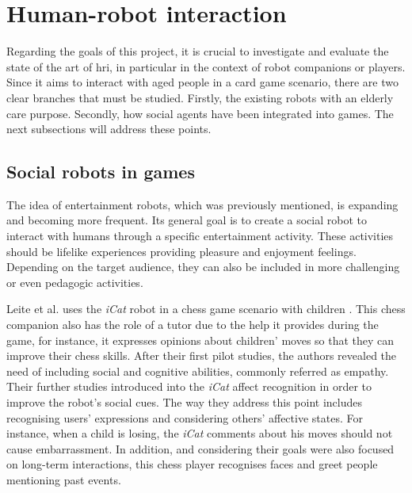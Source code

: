 \section{Human-robot interaction}

Regarding the goals of this project, it is crucial to investigate and evaluate the state of the art of \ac{hri}, in particular in the context of robot companions or players.
Since it aims to interact with aged people in a card game scenario, there are two clear branches that must be studied.
Firstly, the existing robots with an elderly care purpose.
Secondly, how social agents have been integrated into games.
The next subsections will address these points.


\subsection{Social robots in games}

The idea of entertainment robots, which was previously mentioned, is expanding and becoming more frequent.
Its general goal is to create a social robot to interact with humans through a specific entertainment activity.
These activities should be lifelike experiences providing pleasure and enjoyment feelings.
Depending on the target audience, they can also be included in more challenging or even pedagogic activities.

Leite et al. uses the \emph{iCat} robot in a chess game scenario with children \cite{Castellano2010,Leite,Leitea}.
This chess companion also has the role of a tutor due to the help it provides during the game, for instance, it expresses opinions about children' moves so that they can improve their chess skills.
After their first pilot studies, the authors revealed the need of including social and cognitive abilities, commonly referred as empathy.
Their further studies introduced into the \emph{iCat} affect recognition in order to improve the robot's social cues.
The way they address this point includes recognising users' expressions and considering others' affective states.
For instance, when a child is losing, the \emph{iCat} comments about his moves should not cause embarrassment.
In addition, and considering their goals were also focused on long-term interactions, this chess player recognises faces and greet people mentioning past events.

